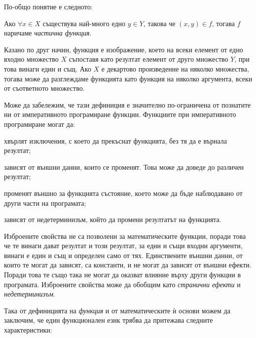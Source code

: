 По-общо понятие е следното:

\begin{definition}
  Ако $\forall x \in X$ съществува най-много едно $y \in Y$, такова че $(x, y) \in f$, тогава $f$ наричаме \emph{частична функция}.
\end{definition}

Казано по друг начин, функция е изображение, което на всеки елемент от едно входно множество $X$ съпоставя като резултат елемент от друго множество $Y$, при това винаги един и същ. Ако $X$ е декартово произведение на няколко множества, тогава може да разглеждаме функцията като функция на няколко аргумента, всеки от съответното множество.

Може да забележим, че тази дефиниция е значително по-ограничена от познатите ни от императивното програмиране функции. Функциите при императивното програмиране могат да:

\begin{itemize*}
  \item хвърлят изключения, с което да прекъснат функцията, без тя да е върнала резултат;
  \item зависят от външни данни, които се променят. Това може да доведе до различен резултат;
  \item променят външно за функцията състояние, което може да бъде наблюдавано от други части на програмата;
  \item зависят от недетерминизъм, който да промени резултатът на функцията.
\end{itemize*}

Изброените свойства не са позволени за математическите функции, поради това че те винаги дават резултат и този резултат, за едни и същи входни аргументи, винаги е един и същ и определен само от тях. Единствените външни данни, от които те могат да зависят, са константи, и не могат да зависят от външни ефекти. Поради това те също така не могат да оказват влияние върху други функции в програмата. Изброените свойства може да обобщим като \emph{странични ефекти} и \emph{недетерминизъм}.

Така от дефиницията на \emph{функция} и от математическите ѝ основи можем да заключим, че един функционален език трябва да притежава следните характеристики:


